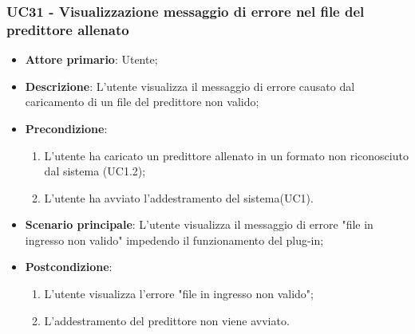 \subsubsection{UC31 - Visualizzazione messaggio di errore nel file del predittore allenato}
\label{sssec:uc31}
\begin{itemize}
  \item \textbf{Attore primario}: Utente;
  \item \textbf{Descrizione}: L'utente visualizza il messaggio di errore causato dal caricamento di un file del predittore non valido;
  \item \textbf{Precondizione}:
  \begin{enumerate}
		\item L'utente ha caricato un predittore allenato in un formato non riconosciuto dal sistema (UC1.2);
		\item L'utente ha avviato l'addestramento del sistema(UC1).
	\end{enumerate}
  \item \textbf{Scenario principale}: L'utente visualizza il messaggio di errore "file in ingresso non valido" impedendo il funzionamento del plug-in;
  \item \textbf{Postcondizione}:
  \begin{enumerate}
		\item L'utente visualizza l'errore "file in ingresso non valido";
		\item L'addestramento del predittore non viene avviato.
	\end{enumerate}
\end{itemize}
